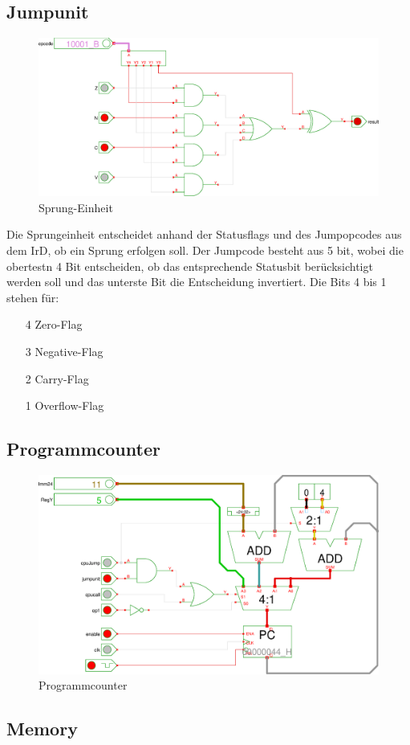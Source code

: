 \subsection{Jumpunit}
\begin{figure}[!h]
\centering
\includegraphics[width=1\textwidth]{images/ju.eps}
\caption{\label{HW:JU}Sprung-Einheit}
\end{figure}
Die Sprungeinheit entscheidet anhand der Statusflags und des Jumpopcodes aus dem IrD, ob ein Sprung erfolgen soll. Der Jumpcode besteht aus 5 bit, wobei die obertestn 4 Bit entscheiden, ob das entsprechende Statusbit berücksichtigt werden soll und das unterste Bit die Entscheidung invertiert. Die Bits 4 bis 1 stehen für:
\begin{enumerate}
 \item[4] Zero-Flag
 \item[3] Negative-Flag
 \item[2] Carry-Flag
 \item[1] Overflow-Flag
\end{enumerate}
\subsection{Programmcounter}
\begin{figure}[h]
\centering
\includegraphics[width=1\textwidth]{images/pc.eps}
\caption{\label{HW:PC}Programmcounter}
\end{figure}
\subsection{Memory}

